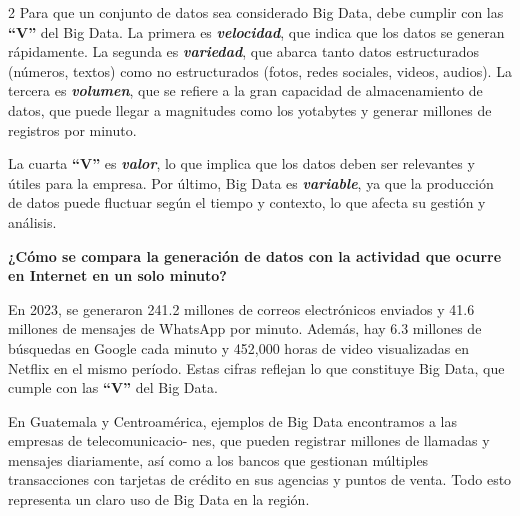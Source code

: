 \documentclass[12pt,spanish,Letterpaper,openany]{book}
\begin{document}
\begin {multicols}{2}
Para que un conjunto de datos sea considerado Big Data, debe cumplir con las \textbf{``V''} del Big Data. La primera es \textbf{\emph{velocidad}}, que indica que los datos se generan rápidamente. La segunda es \textbf{\emph{variedad}}, que abarca tanto datos estructurados (números, textos) como no estructurados (fotos, redes sociales, videos, audios). La tercera es \textbf{\emph{volumen}}, que se refiere a la gran capacidad de almacenamiento de datos, que puede llegar a magnitudes como los yotabytes y generar millones de registros por minuto.

La cuarta \textbf{``V''} es \textbf{\emph{valor}}, lo que implica que los datos deben ser relevantes y útiles para la empresa. Por último, Big Data es \textbf{\emph{variable}}, ya que la producción de datos puede fluctuar según el tiempo y contexto, lo que afecta su gestión y análisis.

\textbf{¿Cómo se compara la generación de datos con la actividad que ocurre en Internet en un solo minuto?}

En 2023, se generaron 241.2 millones de correos electrónicos enviados y 41.6 millones de mensajes de WhatsApp por minuto. Además, hay 6.3 millones de búsquedas en Google cada minuto y 452,000 horas de video visualizadas en Netflix en el mismo período. Estas cifras reflejan lo que constituye Big Data, que cumple con las \textbf{``V''} del Big Data.

En Guatemala y Centroamérica, ejemplos de Big Data encontramos a las empresas de telecomunicacio-
nes, que pueden registrar millones de llamadas y mensajes diariamente, así como a los bancos que gestionan múltiples transacciones con tarjetas de crédito en sus agencias y puntos de venta. Todo esto representa un claro uso de Big Data en la región.

\begin {flushleft}
\noindent\begin{minipage}[c]{\columnwidth}


\end{minipage}
\end{flushleft}
\end{multicols}
\end{document}
